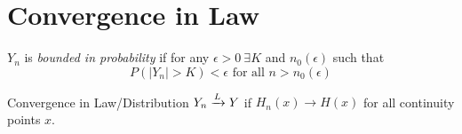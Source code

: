 \section{Convergence in Law}%
\label{sec:convergence_in_law}

\begin{definition}
    $Y_n$ is \textit{bounded in probability} if for any $\epsilon>0\ \exists K$
    and $n_0(\epsilon)$ such that
    \begin{equation*}
        P(|Y_n| > K) < \epsilon \text{ for all } n > n_0(\epsilon)
    \end{equation*}
\end{definition}

\begin{definition}{Convergence in Law/Distribution}
    $Y_n \xrightarrow{L} Y$ if $H_n(x) \to H(x)$ for all continuity points $x$.
\end{definition}
